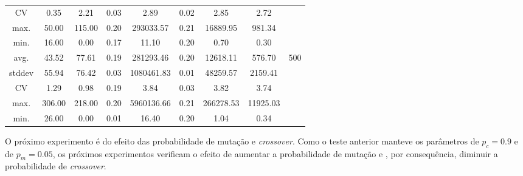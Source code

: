 \documentclass[a4paper]{paper}
\begin{document}
\begin{table}[h!]
\begin{tabular}{| c | c | c | c | c | c | c | c | c |}
    CV & 0.35 & 2.21 & 0.03 & 2.89 & 0.02 & 2.85 & 2.72 & \\ \cline{1-8}
    max. & 50.00 & 115.00 & 0.20 & 293033.57 & 0.21 & 16889.95 & 981.34 & \\ \cline{1-8}
    min. & 16.00 & 0.00 & 0.17 & 11.10 & 0.20 & 0.70 & 0.30 & \\ \hline \hline
    avg. & 43.52 & 77.61 & 0.19 & 281293.46 & 0.20 & 12618.11 & 576.70 & \multirow{5}{1.5cm}{500} \\ \cline{1-8}
    stddev & 55.94 & 76.42 & 0.03 & 1080461.83 & 0.01 & 48259.57 & 2159.41 & \\ \cline{1-8}
    CV & 1.29 & 0.98 & 0.19 & 3.84 & 0.03 & 3.82 & 3.74 & \\ \cline{1-8}
    max. & 306.00 & 218.00 & 0.20 & 5960136.66 & 0.21 & 266278.53 & 11925.03 & \\ \cline{1-8}
    min. & 26.00 & 0.00 & 0.01 & 16.40 & 0.20 & 1.04 & 0.34 & \\ \hline \hline
  \end{tabular}
\end{table}

O próximo experimento é do efeito das probabilidade de mutação e
\textit{crossover}.  Como o teste anterior manteve os parâmetros de $p_c=0.9$ e
de $p_m=0.05$, os próximos experimentos verificam o efeito de aumentar a
probabilidade de mutação e , por consequência, diminuir a probabilidade de
\textit{crossover}.
\end{document}
